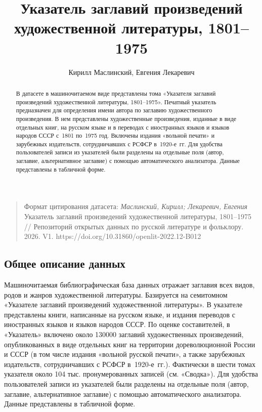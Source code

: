 \documentclass[
  russian,
]{article}
\title{Указатель заглавий произведений художественной литературы,
1801--1975}
\author{Кирилл Маслинский, Евгения Лекаревич}
\date{}
\begin{document}
\maketitle
\begin{abstract}
В датасете в машиночитаемом виде представлены тома «Указателя заглавий
произведений художественной литературы, 1801--1975». Печатный указатель
предназначен для определения имени автора по заглавию художественного
произведения. В нем представлены художественные произведения, изданные в
виде отдельных книг, на русском языке и в переводах с иностранных языков
и языков народов СССР с~1801 по~1975 год. Включены издания «вольной
печати» и зарубежных издательств, сотрудничавших с РСФСР в~1920‑е~гг.
Для удобства пользователей записи из указателей были разделены на
отдельные поля (автор, заглавие, альтернативное заглавие) с помощью
автоматического анализатора. Данные представлены в табличной форме.
\end{abstract}

\begin{quote}
Формат цитирования датасета: \emph{Маслинский, Кирилл; Лекаревич,
Евгения} Указатель заглавий произведений художественной литературы,
1801--1975 // Репозиторий открытых данных по русской литературе и
фольклору. 2026. V1. https://doi.org/10.31860/openlit-2022.12-B012
\end{quote}

\subsection{Общее описание
данных}\label{ux43eux431ux449ux435ux435-ux43eux43fux438ux441ux430ux43dux438ux435-ux434ux430ux43dux43dux44bux445}

Машиночитаемая библиографическая база данных отражает заглавия всех
видов, родов и жанров художественной литературы. Базируется на
семитомном «Указателе заглавий произведений художественной литературы».
В указателе представлены книги, написанные на русском языке, и издания
переводов с иностранных языков и языков народов СССР. По оценке
составителей, в «Указатель» включено около 130000 заглавий
художественных произведений, опубликованных в виде отдельных книг на
территории дореволюционной России и СССР (в том числе издания «вольной
русской печати», а также зарубежных издательств, сотрудничавших с РСФСР
в~1920‑е~гг.). Фактически в шести томах указателя около 104 тыс.
пронумерованных записей (см. «Сводка»). Для удобства пользователей
записи из указателей были разделены на отдельные поля (автор, заглавие,
альтернативное заглавие) с помощью автоматического анализатора. Данные
представлены в табличной форме.
\end{document}
